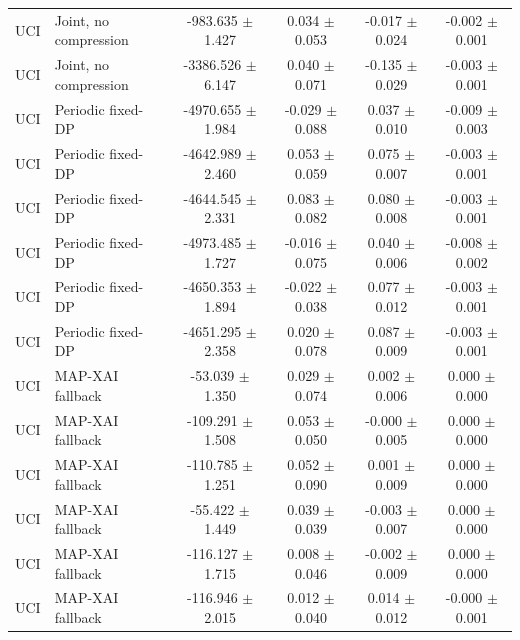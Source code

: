 \begin{tabular}{llcccc}
UCI & Joint, no compression & -983.635 $\pm$ 1.427 & 0.034 $\pm$ 0.053 & -0.017 $\pm$ 0.024 & -0.002 $\pm$ 0.001 \\
UCI & Joint, no compression & -3386.526 $\pm$ 6.147 & 0.040 $\pm$ 0.071 & -0.135 $\pm$ 0.029 & -0.003 $\pm$ 0.001 \\
UCI & Periodic fixed-DP & -4970.655 $\pm$ 1.984 & -0.029 $\pm$ 0.088 & 0.037 $\pm$ 0.010 & -0.009 $\pm$ 0.003 \\
UCI & Periodic fixed-DP & -4642.989 $\pm$ 2.460 & 0.053 $\pm$ 0.059 & 0.075 $\pm$ 0.007 & -0.003 $\pm$ 0.001 \\
UCI & Periodic fixed-DP & -4644.545 $\pm$ 2.331 & 0.083 $\pm$ 0.082 & 0.080 $\pm$ 0.008 & -0.003 $\pm$ 0.001 \\
UCI & Periodic fixed-DP & -4973.485 $\pm$ 1.727 & -0.016 $\pm$ 0.075 & 0.040 $\pm$ 0.006 & -0.008 $\pm$ 0.002 \\
UCI & Periodic fixed-DP & -4650.353 $\pm$ 1.894 & -0.022 $\pm$ 0.038 & 0.077 $\pm$ 0.012 & -0.003 $\pm$ 0.001 \\
UCI & Periodic fixed-DP & -4651.295 $\pm$ 2.358 & 0.020 $\pm$ 0.078 & 0.087 $\pm$ 0.009 & -0.003 $\pm$ 0.001 \\
UCI & MAP-XAI fallback & -53.039 $\pm$ 1.350 & 0.029 $\pm$ 0.074 & 0.002 $\pm$ 0.006 & 0.000 $\pm$ 0.000 \\
UCI & MAP-XAI fallback & -109.291 $\pm$ 1.508 & 0.053 $\pm$ 0.050 & -0.000 $\pm$ 0.005 & 0.000 $\pm$ 0.000 \\
UCI & MAP-XAI fallback & -110.785 $\pm$ 1.251 & 0.052 $\pm$ 0.090 & 0.001 $\pm$ 0.009 & 0.000 $\pm$ 0.000 \\
UCI & MAP-XAI fallback & -55.422 $\pm$ 1.449 & 0.039 $\pm$ 0.039 & -0.003 $\pm$ 0.007 & 0.000 $\pm$ 0.000 \\
UCI & MAP-XAI fallback & -116.127 $\pm$ 1.715 & 0.008 $\pm$ 0.046 & -0.002 $\pm$ 0.009 & 0.000 $\pm$ 0.000 \\
UCI & MAP-XAI fallback & -116.946 $\pm$ 2.015 & 0.012 $\pm$ 0.040 & 0.014 $\pm$ 0.012 & -0.000 $\pm$ 0.001 \\
\bottomrule
\end{tabular}
